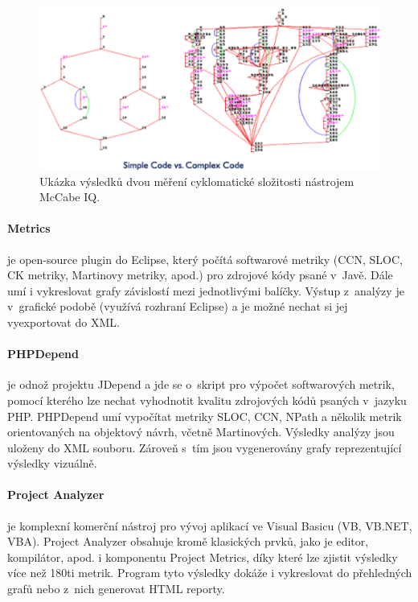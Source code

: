 \documentclass[11pt,twoside,a4paper]{book}
\begin{document}
\begin{figure}[H]
\begin{center}
\includegraphics[width=12cm]{figures/mccabe_iq.pdf}
\caption{Ukázka výsledků dvou měření cyklomatické složitosti nástrojem McCabe IQ.}
\label{fig:mccabe_iq}
\end{center}
\end{figure}

\paragraph{Metrics}\cite{Metrics} je open-source plugin do Eclipse, který počítá softwarové metriky (CCN, SLOC, CK metriky, Martinovy metriky, apod.)
pro zdrojové kódy psané v~Javě. Dále umí i vykreslovat grafy závislostí mezi jednotlivými balíčky. Výstup z~analýzy je v~grafické podobě
(využívá rozhraní Eclipse) a je možné nechat si jej vyexportovat do XML.

\paragraph{PHPDepend}\cite{PHPDepend} je odnož projektu JDepend a jde se o~skript pro výpočet softwarových metrik, pomocí kterého lze nechat vyhodnotit kvalitu
zdrojových kódů psaných v~jazyku PHP. PHPDepend umí vypočítat metriky SLOC, CCN, NPath a několik metrik orientovaných na objektový návrh,
včetně Martinových. Výsledky analýzy jsou uloženy do XML souboru. Zároveň s~tím jsou vygenerovány grafy reprezentující výsledky vizuálně.

\paragraph{Project Analyzer}\cite{ProjectAnalyzer} je komplexní komerční nástroj pro vývoj aplikací ve Visual Basicu (VB, VB.NET, VBA). Project Analyzer
obsahuje kromě klasických prvků, jako je editor, kompilátor, apod. i komponentu Project Metrics, díky které lze zjistit výsledky
více než 180ti metrik. Program tyto výsledky dokáže i vykreslovat do přehledných grafů nebo z~nich generovat HTML reporty.
\end{document}
